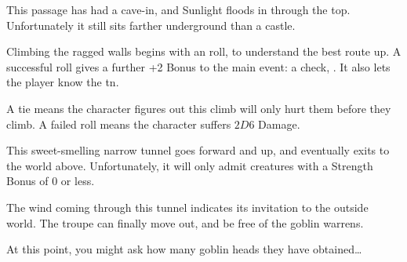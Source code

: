 \begin{multicols}{2}
This passage has had a cave-in, and Sunlight floods in through the top.
Unfortunately it still sits farther underground than a castle.

Climbing the ragged walls begins with an  roll, to understand the best route up.
A successful roll gives a further +2 Bonus to the main event: a  check, \tn[14].
It also lets the player know the \gls{tn}.

A tie means the character figures out this climb will only hurt them before they climb.
A failed roll means the character suffers $2D6$ Damage.


This sweet-smelling narrow tunnel goes forward and up, and eventually exits to the world above.
Unfortunately, it will only admit creatures with a Strength Bonus of 0 or less.


The wind coming through this tunnel indicates its invitation to the outside world.
The troupe can finally move out, and be free of the goblin warrens.

At this point, you might ask how many goblin heads they have obtained\ldots

\end{multicols}
